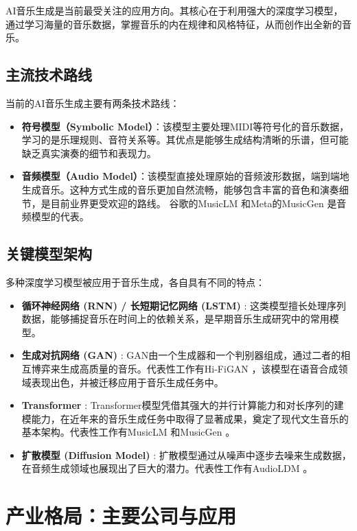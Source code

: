 \documentclass[12pt]{article}
\begin{document}
AI音乐生成是当前最受关注的应用方向。其核心在于利用强大的深度学习模型，通过学习海量的音乐数据，掌握音乐的内在规律和风格特征，从而创作出全新的音乐。

\subsection{主流技术路线}
当前的AI音乐生成主要有两条技术路线：

\begin{itemize}
    \item \textbf{符号模型（Symbolic Model）}：该模型主要处理MIDI等符号化的音乐数据，学习的是乐理规则、音符关系等。其优点是能够生成结构清晰的乐谱，但可能缺乏真实演奏的细节和表现力。
    \item \textbf{音频模型（Audio Model）}：该模型直接处理原始的音频波形数据，端到端地生成音乐。这种方式生成的音乐更加自然流畅，能够包含丰富的音色和演奏细节，是目前业界更受欢迎的路线。 谷歌的MusicLM \cite{agostinelli2023musiclm}和Meta的MusicGen \cite{copet2023simple}是音频模型的代表。
\end{itemize}

\subsection{关键模型架构}
多种深度学习模型被应用于音乐生成，各自具有不同的特点：
\begin{itemize}
    \item \textbf{循环神经网络 (RNN) / 长短期记忆网络 (LSTM)} \cite{hochreiter1997long}: 这类模型擅长处理序列数据，能够捕捉音乐在时间上的依赖关系，是早期音乐生成研究中的常用模型。
    \item \textbf{生成对抗网络 (GAN)} \cite{goodfellow2014generative}: GAN由一个生成器和一个判别器组成，通过二者的相互博弈来生成高质量的音乐。代表性工作有Hi-FiGAN \cite{kong2020hifi}，该模型在语音合成领域表现出色，并被迁移应用于音乐生成任务中。
    \item \textbf{Transformer} \cite{vaswani2017attention}: Transformer模型凭借其强大的并行计算能力和对长序列的建模能力，在近年来的音乐生成任务中取得了显著成果，奠定了现代文生音乐的基本架构。代表性工作有MusicLM \cite{agostinelli2023musiclm}和MusicGen \cite{copet2023simple}。
    \item \textbf{扩散模型 (Diffusion Model)} \cite{ho2020denoising}: 扩散模型通过从噪声中逐步去噪来生成数据，在音频生成领域也展现出了巨大的潜力。代表性工作有AudioLDM \cite{liu2023audioldm}。
\end{itemize}

\section{产业格局：主要公司与应用}
\end{document}
